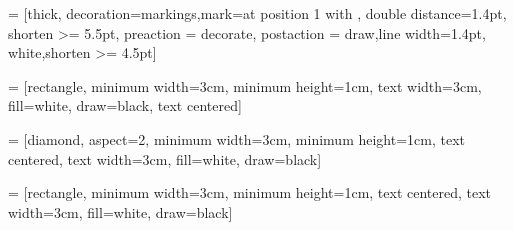 
\usetikzlibrary{shapes.geometric, arrows, decorations.markings, positioning}

 = [thick, decoration={markings,mark=at position
   1 with {}},
   double distance=1.4pt, shorten >= 5.5pt,
   preaction = {decorate},
   postaction = {draw,line width=1.4pt, white,shorten >= 4.5pt}]

 = [rectangle, minimum width=3cm, minimum height=1cm,
                      text width=3cm,
                      fill=white,
                      draw=black,
                      text centered]

 = [diamond, aspect=2, minimum width=3cm, minimum
                      height=1cm,
                      text centered,
                      text width=3cm,
                      fill=white,
                      draw=black]

 = [rectangle, minimum width=3cm, minimum height=1cm,
                      text centered,
                      text width=3cm,
                      fill=white,
                      draw=black]
                      



